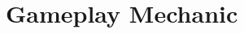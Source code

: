 \documentclass[conference]{IEEEtran}
\begin{document}
\appendices%
\section{Gameplay Mechanic}\label{app:gameplay}




\end{document}
